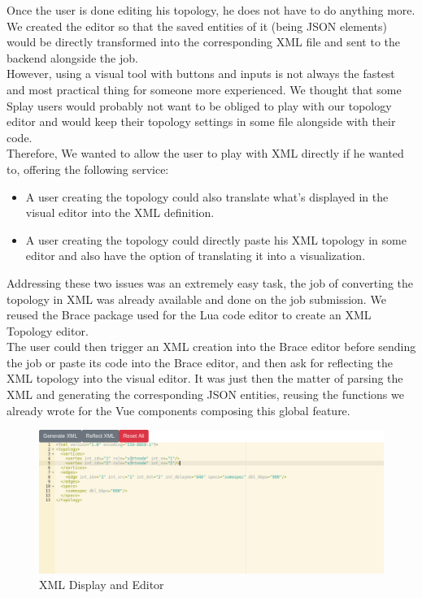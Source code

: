 \documentclass{eplmastersthesis}
\begin{document}
        Once the user is done editing his topology, he does not have to
        do anything more. We created the editor so that the saved entities
        of it (being JSON elements) would be directly transformed into the
        corresponding XML file and sent to the backend alongside the
        job.\\

        However, using a visual tool with buttons and inputs is not always
        the fastest and most practical thing for someone more experienced. We
        thought that some Splay users would probably not want to be obliged
        to play with our topology editor and would keep their topology
        settings in some file alongside with their code.\\
        Therefore, We wanted to allow the user to play with XML directly
        if he wanted to, offering the following service:

        \begin{itemize}
          \item A user creating the topology could also translate what's
          displayed in the visual editor into the XML definition.
          \item A user creating the topology could directly paste
          his XML topology in some editor and also have the option of
          translating it into a visualization.
        \end{itemize}

        Addressing these two issues was an extremely easy task, the job of
        converting the topology in XML was already available and done on
        the job submission. We reused the Brace package used
        for the Lua code editor to create an XML Topology editor.\\
        The user could then trigger an XML creation into the Brace editor
        before sending the job or paste its code into the Brace editor, and
        then ask for reflecting the XML topology into the visual editor. It
        was just then the matter of parsing the XML and generating the
        corresponding JSON entities, reusing the functions we already wrote
        for the Vue components composing this global feature.

        \begin{figure}[H]
          \centering
          \includegraphics[scale=0.5]{figures/xml_topology.png}
          \caption{\label{xml_topology} XML Display and Editor}
        \end{figure}
\end{document}
